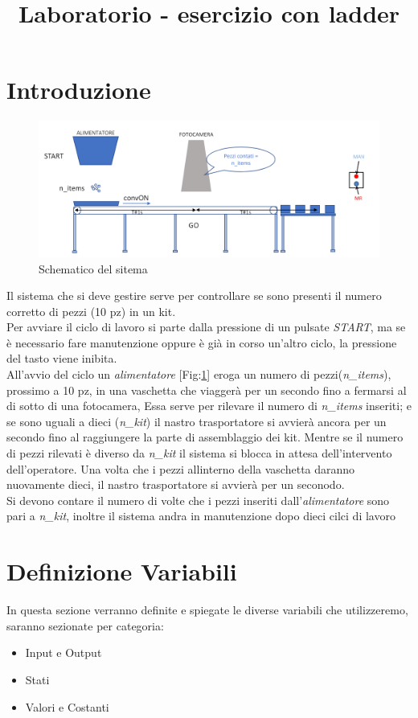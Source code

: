 \documentclass{article}
\title{Laboratorio - esercizio con ladder}
\date{}
\begin{document}
\tableofcontents

\section{Introduzione}

\begin{figure}[b]
    \centering
    \includegraphics[width = 0.8 \linewidth]{schematico.png}
    \caption{Schematico del sitema}
    \label{fig:schematico}
\end{figure}

Il sistema che si deve gestire serve per controllare se sono presenti il numero corretto di pezzi (10 pz) in un kit.
\\

Per avviare il ciclo di lavoro si parte dalla pressione di un pulsate \textit{START}, ma se è necessario fare manutenzione oppure è già in corso un'altro ciclo, la pressione del tasto viene inibita.
\\

All'avvio del ciclo un \textit{alimentatore} [Fig:\ref*{fig:schematico}] eroga un numero di pezzi(\textit{n\_items}), prossimo a 10 pz, in una vaschetta che viaggerà per un secondo fino a fermarsi al di sotto di una fotocamera, Essa serve per rilevare il numero di \textit{n\_items} inseriti; e se sono uguali a dieci (\textit{n\_kit}) il nastro trasportatore si avvierà ancora per un secondo fino al raggiungere la parte di assemblaggio dei kit. Mentre se il numero di pezzi rilevati è diverso da \textit{n\_kit} il sistema si blocca in attesa dell'intervento dell'operatore. Una volta che i pezzi allinterno della vaschetta daranno nuovamente dieci, il nastro trasportatore si avvierà per un seconodo.
\\

Si devono contare il numero di volte che i pezzi inseriti dall'\textit{alimentatore} sono pari a \textit{n\_kit}, inoltre il sistema andra in manutenzione dopo dieci cilci di lavoro

\section{Definizione Variabili}
In questa sezione verranno definite e spiegate le diverse variabili che utilizzeremo, saranno sezionate per categoria:
\begin{itemize}
    \item Input e Output
    \item Stati
    \item Valori e Costanti
\end{itemize}
\end{document}
